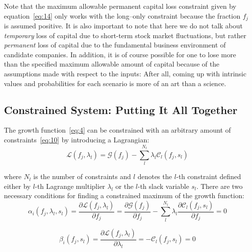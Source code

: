\documentclass{article}
\begin{document}
\indent Note that the maximum allowable permanent capital loss constraint
given by equation~\eqref{eq:14} only works with the long--only constraint
because the fraction $f_j$ is assumed positive. It is also important to note
that here we do not talk about {\it temporary} loss of capital due to short-term
stock market fluctuations, but rather {\it permanent} loss of capital due to the
fundamental business environment of candidate companies. In addition, it is of
course possible for one to lose more than the specified maximum allowable amount
of capital because of the assumptions made with respect to the inputs: After
all, coming up with intrinsic values and probabilities for each scenario is more
of an art than a science.


\subsection{Constrained System: Putting It All Together}
\label{sec:constrainedSystem}

\noindent The growth function~\eqref{eq:4} can be constrained with an arbitrary
amount of constraints~\eqref{eq:10} by introducing a Lagrangian:
\begin{equation}
\label{eq:15}
    \mathcal{L}(f_j, \lambda_l)
  =
    \mathcal{G}(f_j) - \sum_l^{N_l} \lambda_l \mathcal{C}_l(f_j, s_l)
\end{equation}

\noindent where $N_l$ is the number of constraints and $l$ denotes the $l$-th
constraint defined either by $l$-th Lagrange multiplier $\lambda_l$ or the
$l$-th slack variable $s_l$. There are two necessary conditions for finding a
constrained maximum of the growth function:
\begin{equation}
\label{eq:16}
    \alpha_i(f_j, \lambda_l, s_l)
  =
    \frac{\partial \mathcal{L}(f_j, \lambda_l)}{\partial f_j}
  =
    \frac{\partial \mathcal{G}(f_j)}{\partial f_j}
  - \sum_l^{N_l} \lambda_l \frac{\partial{\mathcal{C}_l(f_j, s_l)}}{\partial f_j}
  =
    0
\end{equation}

\begin{equation}
\label{eq:17}
    \beta_i(f_j, s_l)
  =
    \frac{\partial \mathcal{L}(f_j, \lambda_l)}{\partial \lambda_l}
  =
    - \mathcal{C}_l(f_j, s_l)
  =
    0
\end{equation}
\end{document}
